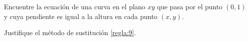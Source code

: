  



 \begin{problema}
 \label{soc:solved:22.20}
  Encuentre la ecuaci\'on de una curva en el plano $xy$ que pasa por el punto $(0,1)$ y cuya pendiente es igual a la altura en cada punto $(x,y).$
 \end{problema}




 \begin{problema}
  \label{soc:solved:22.21}
  Justifique el método de sustituci\'on \eqref{regla:9}.
 \end{problema}



%
%


%
%
%
%
%
